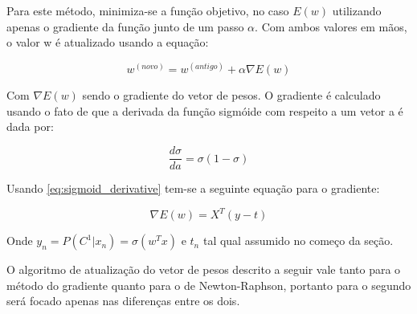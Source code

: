 Para este método, minimiza-se a função objetivo, no caso $E(w)$ utilizando apenas o gradiente
da função junto de um passo $\alpha$. Com ambos valores em mãos, o valor w é atualizado usando
a equação:

\begin{center}
	\begin{equation}
		w^{ ( novo )} = w^{ (antigo) }  + \alpha \nabla E(w)
	\end{equation}
\end{center}

Com $\nabla E(w)$ sendo o gradiente do vetor de pesos. O gradiente é calculado usando o fato de que
a derivada da função sigmóide com respeito a um vetor a é dada por:

\begin{center}
	\begin{equation}
	\label{eq:sigmoid_derivative}
		\frac{d \sigma}{d a} = \sigma (1 - \sigma )
	\end{equation}
\end{center}

Usando \ref{eq:sigmoid_derivative} tem-se a seguinte equação para o gradiente:

\begin{center}
	\begin{equation}
		\nabla E(w) = X^T(y - t)
	\end{equation}
\end{center}

Onde $y_n = P(C^1 | x_n) = \sigma(w^Tx)$ e $t_n$ tal qual assumido no começo da seção.

O algoritmo de atualização do vetor de pesos descrito a seguir vale tanto para o método
do gradiente quanto para o de Newton-Raphson, portanto para o segundo será focado apenas nas
diferenças entre os dois.

